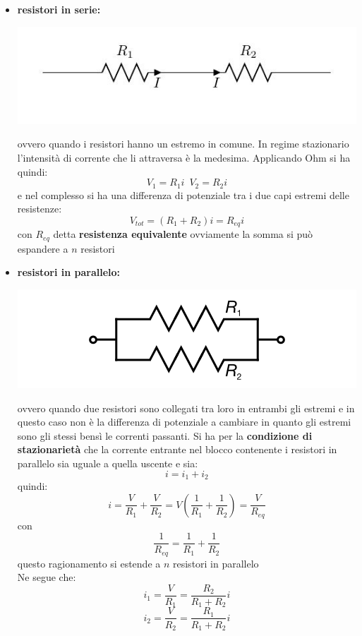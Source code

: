\documentclass[a4paper,12pt, oneside]{book}
\begin{document}
\begin{itemize}
\item \textbf{resistori in serie:}
\begin{center}
\includegraphics[scale=0.6]{img/ele6.jpg}
\end{center}
ovvero quando i resistori hanno un estremo in comune. In regime stazionario l'intensità di corrente che li attraversa è la medesima. Applicando Ohm si ha quindi:
$$V_1=R_1i\,\,\, V_2=R_2i$$
e nel complesso si ha una differenza di potenziale tra i due capi estremi delle resistenze:
$$V_{tot}=(R_1+R_2)i=R_{eq}i$$
con $R_{eq}$ detta \textbf{resistenza equivalente}
ovviamente la somma si può espandere a $n$ resistori
\item \textbf{resistori in parallelo:}
\begin{center}
\includegraphics[scale=0.6]{img/ele7.png}
\end{center}
ovvero quando due resistori sono collegati tra loro in entrambi gli estremi e in questo caso non è la differenza di potenziale a cambiare in quanto gli estremi sono gli stessi bensì le correnti passanti. Si ha per la \textbf{condizione di stazionarietà} che la corrente entrante nel blocco contenente i resistori in parallelo sia uguale a quella uscente e sia:
$$i=i_1+i_2$$
quindi:
$$i=\frac{V}{R_1}+\frac{V}{R_2}=V\left(\frac{1}{R_1}+\frac{1}{R_2}\right)=\frac{V}{R_{eq}}$$
con $$\frac{1}{R_{eq}}=\frac{1}{R_1}+\frac{1}{R_2}$$
questo ragionamento si estende a $n$ resistori in parallelo
\\Ne segue che:
$$i_1=\frac{V}{R_1}=\frac{R_2}{R_1+R_2}i$$
$$i_2=\frac{V}{R_2}=\frac{R_1}{R_1+R_2}i$$
\end{itemize}
\end{document}
